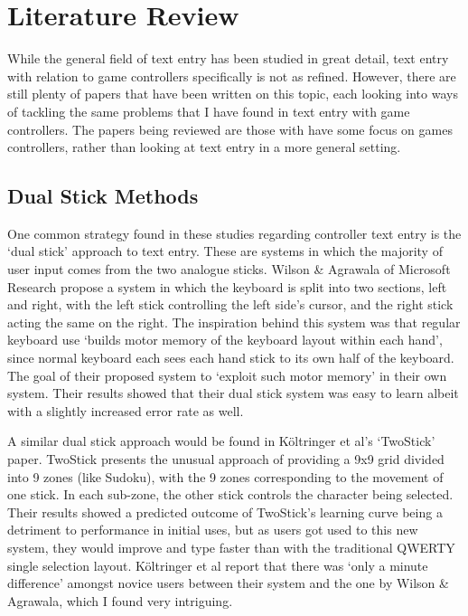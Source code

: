 \documentclass[requirements.tex]{subfiles}
\begin{document}
\section{Literature Review} %
\label{sec:literature_review}

While the general field of text entry has been studied in great detail, text
entry with relation to game controllers specifically is not as refined. However,
there are still plenty of papers that have been written on this topic, each
looking into ways of tackling the same problems that I have found in text entry
with game controllers. The papers being reviewed are those with have some focus
on games controllers, rather than looking at text entry in a more general
setting.

\subsection{Dual Stick Methods} %
\label{sub:dual_stick_methods}
One common strategy found in these studies regarding controller text entry is
the `dual stick' approach to text entry. These are systems in which the majority
of user input comes from the two analogue sticks. Wilson \& Agrawala
\cite{Wilson:2006:TEU:1124772.1124844} of Microsoft Research propose a system
in which the keyboard is split into two sections, left and right, with the
left stick controlling the left side's cursor, and the right stick acting the
same on the right. The inspiration behind this system was that regular keyboard
use `builds motor memory of the keyboard layout within each hand', since normal
keyboard each sees each hand stick to its own half of the keyboard. The goal of
their proposed system to `exploit such motor memory' in their own system. Their
results showed that their dual stick system was easy to learn albeit with a
slightly increased error rate as well. 

A similar dual stick approach would be found in K\"{o}ltringer et al's
\cite{Koltringer:2007:TWG:1268517.1268536} `TwoStick' paper. TwoStick presents
the unusual approach of providing a 9x9 grid divided into 9 zones (like Sudoku),
with the 9 zones corresponding to the movement of one stick. In each sub-zone,
the other stick controls the character being selected. Their results showed a
predicted outcome of TwoStick's learning curve being a detriment to performance
in initial uses, but as users got used to this new system, they would improve
and type faster than with the traditional QWERTY single selection layout. 
K\"{o}ltringer et al report that there was `only a minute difference' amongst
novice users between their system and the one by Wilson \& Agrawala, which I
found very intriguing.
\end{document}
